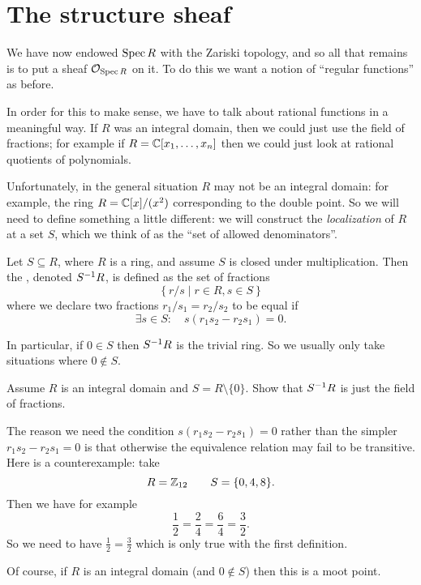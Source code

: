 \section{The structure sheaf}

We have now endowed $\operatorname{Spec} R$ with the Zariski topology,
and so all that remains is to put a sheaf $\mathcal O_{\operatorname{Spec} R}$ on it.
To do this we want a notion of ``regular functions'' as before.

In order for this to make sense, we have to talk about rational
functions in a meaningful way.
If $R$ was an integral domain, then we could just use the field of fractions;
for example if $R = \mathbb C[x_1, \dots, x_n]$ then we could just
look at rational quotients of polynomials.

Unfortunately, in the general situation $R$ may not be an integral domain:
for example, the ring $R = \mathbb C[x] / (x^2)$ corresponding to the double point.
So we will need to define something a little different:
we will construct the \emph{localization} of $R$ at a set $S$,
which we think of as the ``set of allowed denominators''.

\begin{definition}
	Let $S \subseteq R$, where $R$ is a ring,
	and assume $S$ is closed under multiplication.
	Then the , denoted $S^{-1} R$,
	is defined as the set of fractions
	\[ \left\{ r/s \mid r \in R, s \in S \right\} \]
	where we declare two fractions $r_1 / s_1 = r_2 / s_2$ 
	to be equal if 
	\[ \exists s \in S : \quad s(r_1s_2 - r_2s_1) = 0. \]
\end{definition}
In particular, if $0 \in S$ then $S^{-1} R$ is the trivial ring.
So we usually only take situations where $0 \notin S$.
\begin{ques}
	Assume $R$ is an integral domain and $S = R \setminus \{0\}$.
	Show that $S^{-1} R$ is just the field of fractions.
\end{ques}

\begin{example}
	The reason we need the condition $s(r_1s_2 - r_2s_1) = 0$
	rather than the simpler $r_1s_2 - r_2s_1 = 0$ is that
	otherwise the equivalence relation may fail to be transitive.
	Here is a counterexample: take
	\[ R = \mathbb Z_{12} \qquad S = \{ 0, 4, 8 \}. \]
	Then we have for example
	\[ \frac12 = \frac24 = \frac64 = \frac32. \]
	So we need to have $\frac12=\frac32$ which is only true
	with the first definition.

	Of course, if $R$ is an integral domain (and $0\notin S$)
	then this is a moot point.
\end{example}

